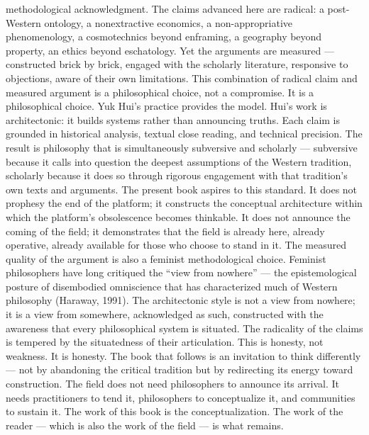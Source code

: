 methodological acknowledgment. The claims advanced here are radical: a post-Western ontology, a nonextractive economics, a non-appropriative phenomenology, a cosmotechnics beyond enframing, a geography beyond property, an ethics beyond eschatology. Yet the arguments are measured — constructed brick by brick, engaged with the scholarly literature, responsive to objections, aware of their own limitations. This combination of radical claim and measured argument is a philosophical choice, not a compromise. It is a philosophical choice. Yuk Hui’s practice provides the model. Hui’s work is architectonic: it builds systems rather than announcing truths. Each claim is grounded in historical analysis, textual close reading, and technical precision. The result is philosophy that is simultaneously subversive and scholarly — subversive because it calls into question the deepest assumptions of the Western tradition, scholarly because it does so through rigorous engagement with that tradition’s own texts and arguments. The present book aspires to this standard. It does not prophesy the end of the platform; it constructs the conceptual architecture within which the platform’s obsolescence becomes thinkable. It does not announce the coming of the field; it demonstrates that the field is already here, already operative, already available for those who choose to stand in it. The measured quality of the argument is also a feminist methodological choice. Feminist philosophers have long critiqued the “view from nowhere” — the epistemological posture of disembodied omniscience that has characterized much of Western philosophy (Haraway, 1991). The architectonic style is not a view from nowhere; it is a view from somewhere, acknowledged as such, constructed with the awareness that every philosophical system is situated. The radicality of the claims is tempered by the situatedness of their articulation. This is honesty, not weakness. It is honesty. The book that follows is an invitation to think differently — not by abandoning the critical tradition but by redirecting its energy toward construction. The field does not need philosophers to announce its arrival. It needs practitioners to tend it, philosophers to conceptualize it, and communities to sustain it. The work of this book is the conceptualization. The work of the reader — which is also the work of the field — is what remains.
